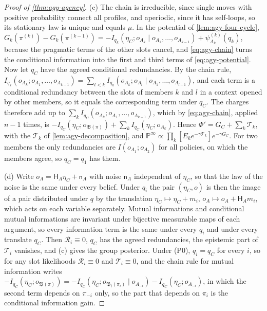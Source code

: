 \begin{proof}[Proof of \cref{thm:agy-agency}]
(c) The chain is irreducible, since single moves with positive probability connect all profiles, and aperiodic, since it has self-loops, so its stationary law is unique and equals $\mu$. In the potential of \cref{lem:agy-four-cycle}, $G_k(\pi^{(k)})-G_k(\pi^{(k-1)})=-I_{q_k}(\eta_C;o_{A_k}\mid o_{A_1},\dots,o_{A_{k-1}})+\psi^{(k)}_{A_k}(q_k)$, because the pragmatic terms of the other slots cancel, and \eqref{eq:agy-chain} turns the conditional information into the first and third terms of \eqref{eq:agy-potential}. Now let $q_C$ have the agreed conditional redundancies. By the chain rule, $I_{q_k}(o_{A_k};o_{A_1},\dots,o_{A_{k-1}})=\sum_{l<k}I_{q_k}(o_{A_k};o_{A_l}\mid o_{A_1},\dots,o_{A_{l-1}})$, and each term is a conditional redundancy between the slots of members $k$ and $l$ in a context opened by other members, so it equals the corresponding term under $q_C$. The charges therefore add up to $\sum_kI_{q_C}(o_{A_k};o_{A_1},\dots,o_{A_{k-1}})$, which by \eqref{eq:agy-chain}, applied $n-1$ times, is $-I_{q_C}(\eta_C;o_{\mathfrak B(\pi)})+\sum_kI_{q_C}(\eta_C;o_{A_k})$. Hence $\Phi'=G_C+\sum_k\mathcal T_k$, with the $\mathcal T_k$ of \cref{lem:agy-decomposition}, and $\mathbb P^\infty\propto\prod_k[E_ke^{-\gamma\mathcal T_k}]e^{-\gamma G_C}$. For two members the only redundancies are $I(o_{A_1};o_{A_2})$ for all policies, on which the members agree, so $q_C=q_1$ has them.

(d) Write $o_A=\mathsf H_A\eta_C+\mathsf n_A$ with noise $\mathsf n_A$ independent of $\eta_C$, so that the law of the noise is the same under every belief. Under $q_i$ the pair $(\eta_C,o)$ is then the image of a pair distributed under $q$ by the translation $\eta_C\mapsto\eta_C+m_i$, $o_A\mapsto o_A+\mathsf H_Am_i$, which acts on each variable separately. Mutual informations and conditional mutual informations are invariant under bijective measurable maps of each argument, so every information term is the same under every $q_i$ and under every translate $q_C$. Then $\mathcal R_i\equiv0$, $q_C$ has the agreed redundancies, the epistemic part of $\mathcal T_i$ vanishes, and (c) gives the group posterior. Under (P0), $q_i=q_C$ for every $i$, so for any slot likelihoods $\mathcal R_i\equiv0$ and $\mathcal T_i\equiv0$, and the chain rule for mutual information writes $-I_{q_C}(\eta_C;o_{\mathfrak B(\pi)})=-I_{q_C}(\eta_C;o_{\mathfrak B_i(\pi_i)}\mid o_{A_{-i}})-I_{q_C}(\eta_C;o_{A_{-i}})$, in which the second term depends on $\pi_{-i}$ only, so the part that depends on $\pi_i$ is the conditional information gain.
\end{proof}

